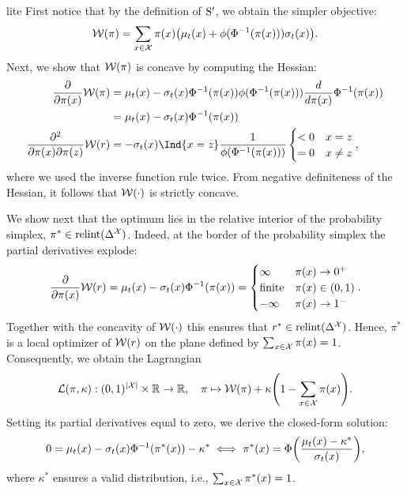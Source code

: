 \begin{solution}{lite}
  First notice that by the definition of $\mathrm{S}'$, we obtain the simpler objective:
  \begin{equation*}
    \spW(\pi) = \sum_{x \in \spX} \pi(x) \parentheses*{ \mu_t(x) + \phi(\Phi^{-1}(\pi(x))) \sigma_t(x) }.
  \end{equation*}
  Next, we show that \(\mathcal{W}(\pi)\) is concave by computing the Hessian:
  \begin{align*}
    \frac{\partial}{\partial \pi(x)} \spW(\pi) & = \mu_t(x) - \sigma_t(x) \Phi^{-1}(\pi(x)) \phi(\Phi^{-1}(\pi(x))) \frac{d}{d \pi(x)} \Phi^{-1}(\pi(x))\\
    & = \mu_t(x) - \sigma_t(x) \Phi^{-1}(\pi(x))\nonumber\\
    \frac{\partial^2}{\partial \pi(x) \partial \pi(z)} \spW(r) & = - \sigma_t(x) \Ind{x=z} \frac{1}{\phi(\Phi^{-1}(\pi(x)))} \begin{cases}
      < 0 & x = z\\
      = 0 & x \not = z
    \end{cases},
  \end{align*}
  where we used the inverse function rule twice.
  From negative definiteness of the Hessian, it follows that $\mathcal{W}(\cdot)$ is strictly concave.

  We show next that the optimum lies in the relative interior of the probability simplex, \(\pi^* \in \text{relint}(\Delta^{\mathcal{X}})\).
  Indeed, at the border of the probability simplex the partial derivatives explode:
  \begin{equation*}
    \frac{\partial}{\partial \pi(x)} \mathcal{W}(r) = \mu_t(x) - \sigma_t(x) \Phi^{-1}(\pi(x)) = \begin{cases}
      \infty & \pi(x) \to 0^+\\
      \text{finite} & \pi(x) \in (0,1)\\
      -\infty & \pi(x) \to 1^-
    \end{cases}.
  \end{equation*}
  Together with the concavity of \(\mathcal{W}(\cdot)\) this ensures that \(r^* \in \text{relint}(\Delta^{\mathcal{X}})\).
  Hence, \(\pi^*\) is a local optimizer of \(\mathcal{W}(r)\) on the plane defined by \({\sum_{x \in \mathcal{X}} \pi(x) = 1}\).
  Consequently, we obtain the Lagrangian
  \begin{equation*}
    \spL(\pi, \kappa) : (0,1)^{|\spX|} \times \R \to \R,\quad \pi \mapsto \spW(\pi) + \kappa \parentheses*{1-\sum_{x\in\spX} \pi(x)}.
  \end{equation*}
  Setting its partial derivatives equal to zero, we derive the closed-form solution:
  \begin{align*}
    0 = \mu_t(x) - \sigma_t(x) \Phi^{-1}(\pi^*(x)) - \kappa^* \iff \pi^*(x)  = \Phi\parentheses*{\frac{\mu_t(x) - \kappa^*}{\sigma_t(x)}},
  \end{align*}
  where \(\kappa^*\) ensures a valid distribution, i.e., \(\sum_{x\in \mathcal{X}} \pi^*(x) = 1\).
\end{solution}

